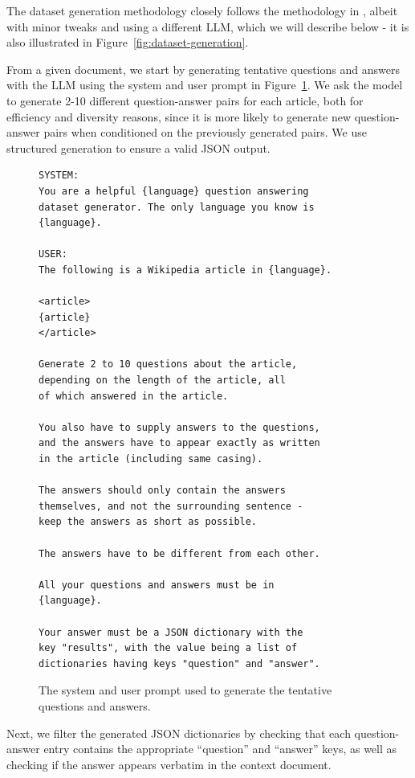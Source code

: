 \documentclass[10pt, a4paper]{article}
\begin{document}
The dataset generation methodology closely follows the methodology in
, albeit with minor tweaks and using a
different LLM, which we will describe below - it is also illustrated in
Figure~\ref{fig:dataset-generation}.

From a given document, we start by generating tentative questions and answers with the
LLM using the system and user prompt in Figure~\ref{fig:generation-prompt}. We ask the
model to generate 2-10 different question-answer pairs for each article, both for
efficiency and diversity reasons, since it is more likely to generate new
question-answer pairs when conditioned on the previously generated pairs. We use
structured generation to ensure a valid JSON output.

\begin{figure}
\scriptsize
\begin{verbatim}
SYSTEM:
You are a helpful {language} question answering
dataset generator. The only language you know is
{language}.

USER:
The following is a Wikipedia article in {language}.

<article>
{article}
</article>

Generate 2 to 10 questions about the article,
depending on the length of the article, all
of which answered in the article.

You also have to supply answers to the questions,
and the answers have to appear exactly as written
in the article (including same casing).

The answers should only contain the answers
themselves, and not the surrounding sentence -
keep the answers as short as possible.

The answers have to be different from each other.

All your questions and answers must be in
{language}.

Your answer must be a JSON dictionary with the
key "results", with the value being a list of
dictionaries having keys "question" and "answer".
\end{verbatim}
\caption{The system and user prompt used to generate the tentative questions and answers.}
\label{fig:generation-prompt}
\end{figure}

Next, we filter the generated JSON dictionaries by checking that each question-answer
entry contains the appropriate ``question'' and ``answer'' keys, as well as checking if
the answer appears verbatim in the context document.
\end{document}
